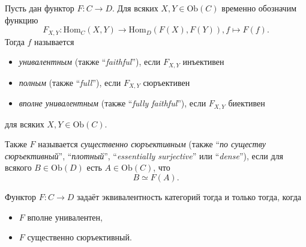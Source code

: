 \documentclass[12pt,a4paper]{article}
\newcommand{\Hom}{\mathrm{Hom}}
\newcommand{\Ob}{\mathrm{Ob}}
\begin{document}
    \begin{definition}
        Пусть дан функтор $F: C \to D$. Для всяких $X, Y \in \Ob(C)$ временно обозначим функцию
        \[F_{X, Y}: \Hom_C(X, Y) \to \Hom_D(F(X), F(Y)), f \mapsto F(f).\]
        Тогда $f$ называется
        \begin{itemize}
            \item \emph{унивалентным} (также ``\emph{faithful}''), если $F_{X, Y}$ инъективен
            \item \emph{полным} (также ``\emph{full}''), если $F_{X, Y}$ сюръективен
            \item \emph{вполне унивалентным} (также ``\emph{fully faithful}''), если $F_{X, Y}$ биективен
        \end{itemize}
        для всяких $X, Y \in \Ob(C)$.

        Также $F$ называется \emph{существенно сюръективным} (также ``\emph{по существу сюръективный}'', ``\emph{плотный}'', ``\emph{essentially surjective}'' или ``\emph{dense}''), если для всякого $B \in \Ob(D)$ есть $A \in \Ob(C)$, что
        \[B \simeq F(A).\]
    \end{definition}

    \begin{theorem}
        Функтор $F: C \to D$ задаёт эквивалентность категорий тогда и только тогда, когда
        \begin{itemize}
            \item $F$ вполне унивалентен,
            \item $F$ существенно сюръективный.
        \end{itemize}
    \end{theorem}
\end{document}
